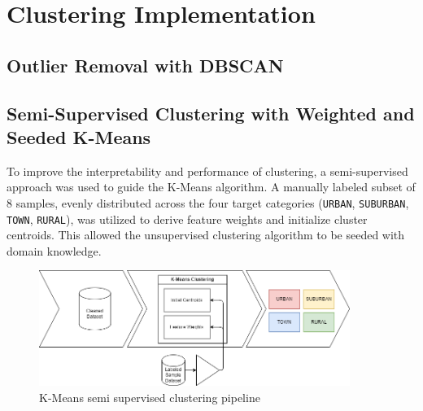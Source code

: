 \documentclass[a4paper,12pt,twoside]{scrreprt}
\begin{document}
\section{Clustering Implementation}





\subsection{Outlier Removal with DBSCAN}



\subsection{Semi-Supervised Clustering with Weighted and Seeded K-Means}


To improve the interpretability and performance of clustering, a
semi-supervised approach was used to guide the K-Means algorithm. A manually
labeled subset of 8 samples, evenly distributed across the four target
categories (\texttt{URBAN}, \texttt{SUBURBAN}, \texttt{TOWN}, \texttt{RURAL}),
was utilized to derive feature weights and initialize cluster centroids. This
allowed the unsupervised clustering algorithm to be seeded with domain
knowledge.

\begin{figure}[htbp]
  \centering

  \includegraphics[width=0.9\textwidth]{Diagrams/drawio/implementation/clustering_pipeline.png}
  \caption{K-Means semi supervised clustering pipeline}
  \label{fig:kmeans-clustering-pipline}
\end{figure}
\FloatBarrier
\end{document}
